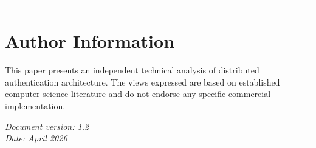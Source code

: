 \documentclass[11pt,a4paper]{article}
\begin{document}
\vspace{1cm}
\noindent\rule{\textwidth}{0.4pt}

\section*{Author Information}

\noindent
This paper presents an independent technical analysis of distributed authentication architecture. The views expressed are based on established computer science literature and do not endorse any specific commercial implementation.

\vspace{0.5cm}
\noindent
\textit{Document version: 1.2}\\
\textit{Date: April 2026}
\end{document}
